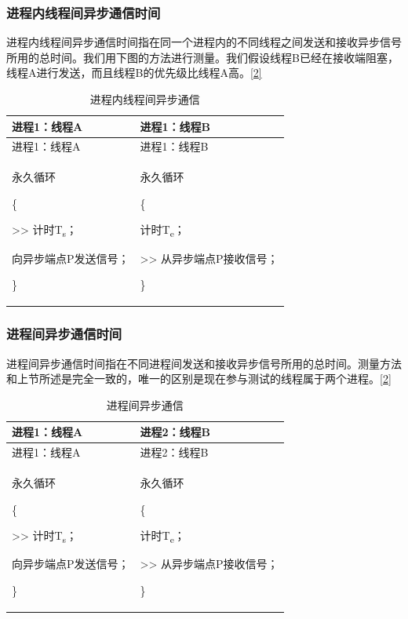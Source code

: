 \subsubsection{进程内线程间异步通信时间}\label{subsubsec:1-intra-process-async-communication}

进程内线程间异步通信时间指在同一个进程内的不同线程之间发送和接收异步信号所用的总时间。我们用下图的方法进行测量。我们假设线程B已经在接收端阻塞，线程A进行发送，而且线程B的优先级比线程A高。\hyperref[cite:1-2]{{[}2{]}}

\begin{xltabular}{\textwidth}{@{}>{\hsize\raggedright\arraybackslash}X>{\hsize\raggedright\arraybackslash}X@{}}
\caption{进程内线程间异步通信}\label{tab:1-9-intra-process-async-communication}\\
\toprule
进程1：线程A & 进程1：线程B\tabularnewline
\endfirsthead
\toprule
进程1：线程A & 进程1：线程B\tabularnewline
\midrule
\endhead
\bottomrule
\endlastfoot
永久循环

\{

\textgreater\textgreater{} 计时T\textsubscript{s}；

向异步端点P发送信号；

\}\strut
 & 永久循环

\{

计时T\textsubscript{e}；

\textgreater\textgreater{} 从异步端点P接收信号；

\}\strut
\tabularnewline
\end{xltabular}

\subsubsection{进程间异步通信时间}\label{subsubsec:1-inter-process-async-communication}

进程间异步通信时间指在不同进程间发送和接收异步信号所用的总时间。测量方法和上节所述是完全一致的，唯一的区别是现在参与测试的线程属于两个进程。\hyperref[cite:1-2]{{[}2{]}}

\begin{xltabular}{\textwidth}{@{}>{\hsize\raggedright\arraybackslash}X>{\hsize\raggedright\arraybackslash}X@{}}
\caption{进程间异步通信}\label{tab:1-10-inter-process-async-communication}\\
\toprule
进程1：线程A & 进程2：线程B\tabularnewline
\endfirsthead
\toprule
进程1：线程A & 进程2：线程B\tabularnewline
\midrule
\endhead
\bottomrule
\endlastfoot
永久循环

\{

\textgreater\textgreater{} 计时T\textsubscript{s}；

向异步端点P发送信号；

\}\strut
 & 永久循环

\{

计时T\textsubscript{e}；

\textgreater\textgreater{} 从异步端点P接收信号；

\}\strut
\tabularnewline
\end{xltabular}

